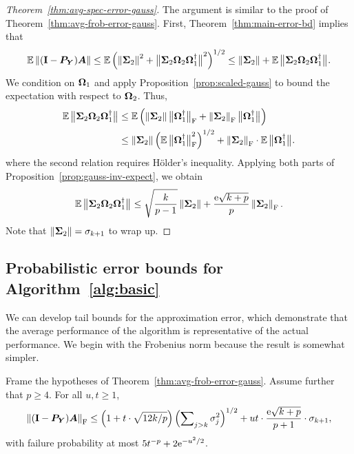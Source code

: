\documentclass[final]{siamltex}
\newcounter{algorithm}[section]
\begin{document}
\lsp

\begin{proof}[Theorem~\ref{thm:avg-spec-error-gauss}]
The argument is similar to the proof of Theorem~\ref{thm:avg-frob-error-gauss}.
First, Theorem~\ref{thm:main-error-bd} %
implies that
$$
\Expect \norm{ (\Id - \mtx{P}_{\mtx{Y}}) \mtx{A} }
    \leq \Expect \left( \normsq{\mtx{\Sigma}_2}
        + \smnorm{}{\mtx{\Sigma}_2 \mtx{\Omega}_2 \mtx{\Omega}_1^\psinv }^2 \right)^{1/2}
    \leq \norm{\mtx{\Sigma}_2} + \Expect \smnorm{}{ \mtx{\Sigma}_2 \mtx{\Omega}_2 \mtx{\Omega}_1^\psinv }.
$$
We condition on $\mtx{\Omega}_1$ and apply
Proposition~\ref{prop:scaled-gauss} to bound the expectation with
respect to $\mtx{\Omega}_2$.  Thus,
\begin{align*}
\Expect \smnorm{}{ \mtx{\Sigma}_2 \mtx{\Omega}_2
\mtx{\Omega}_1^\psinv }
    &\leq \Expect \left( \norm{\mtx{\Sigma}_2} \smnorm{\rm F}{\mtx{\Omega}_1^\psinv}
        + \fnorm{\mtx{\Sigma}_2} \smnorm{}{\mtx{\Omega}_1^\psinv} \right) \\
    &\leq \norm{\mtx{\Sigma}_2} \left( \Expect \smnorm{\rm F}{\mtx{\Omega}_1^\psinv}^2 \right)^{1/2}
        + \fnorm{\mtx{\Sigma}_2} \cdot \Expect \smnorm{}{\mtx{\Omega}_1^\psinv}.
\end{align*}
where the second relation requires H{\"o}lder's inequality.
Applying both parts of Proposition~\ref{prop:gauss-inv-expect}, we obtain
$$
\Expect \smnorm{}{ \mtx{\Sigma}_2 \mtx{\Omega}_2
\mtx{\Omega}_1^\psinv }
    \leq \sqrt{\frac{k}{p-1}} \norm{\mtx{\Sigma}_2}
    + \frac{\econst\sqrt{k+p}}{p} \fnorm{\mtx{\Sigma}_2}.
$$
Note that $\norm{\mtx{\Sigma}_2} = \sigma_{k+1}$ to wrap up.
\end{proof}


\subsection{Probabilistic error bounds for Algorithm~\ref{alg:basic}}
\label{sec:prob-failure}

We can develop tail bounds for the approximation error, which
demonstrate that the average performance of the algorithm
is representative of the actual performance.  We begin with
the Frobenius norm because the result is somewhat simpler.

\lsp

\begin{theorem} \label{thm:tail-frob-error-gauss}
Frame the hypotheses of Theorem~\ref{thm:avg-frob-error-gauss}.
Assume further that $p \geq 4$.  For all $u, t \geq 1$,
$$
\fnorm{ (\Id - \mtx{P}_{\mtx{Y}}) \mtx{A} }
    \leq \left( 1 + t \cdot \sqrt{12k/p} \right)
    \left( \sum\nolimits_{j > k} \sigma_j^2 \right)^{1/2}
    + ut \cdot \frac{\econst\sqrt{k+p}}{p+1} \cdot \sigma_{k+1},
$$
with failure probability at most $5 t^{-p} + 2 \econst^{-u^2/2}$.
\end{theorem}
\end{document}
